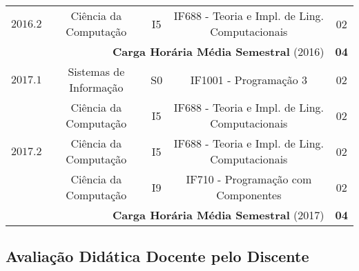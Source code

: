 \documentclass[a4paper,oneside,10pt]{article}
\newcommand{\otoprule}{\midrule[\heavyrulewidth]}
\begin{document}
\begin{table}[!htpb]
\begin{tabular}{ccccc}
\cmidrule{1-5}
$2016.2$ & Ciência da Computação & I5 & IF688 - Teoria e Impl. de Ling. Computacionais & 02\\
\cmidrule{1-5}
\multicolumn{4}{r}{\textbf{Carga Hor\'{a}ria M\'{e}dia Semestral} (2016)} & \textbf{04} \\
\otoprule
$2017.1$ & Sistemas de Informação & S0 & IF1001 - Programação 3 & 02\\
  & Ciência da Computação & I5 & IF688 - Teoria e Impl. de Ling. Computacionais & 02\\
\cmidrule{1-5}
$2017.2$ & Ciência da Computação & I5 & IF688 - Teoria e Impl. de Ling. Computacionais & 02\\
  & Ciência da Computação & I9 & IF710 - Programação com Componentes & 02\\
\cmidrule{1-5}
\multicolumn{4}{r}{\textbf{Carga Hor\'{a}ria M\'{e}dia Semestral} (2017)} & \textbf{04} \\
\bottomrule
\end{tabular}
\label{Tab:Disc_Grad}
\end{table}

\subsection{Avaliação Didática Docente pelo Discente}
\vspace{0.3cm}

\end{document}
